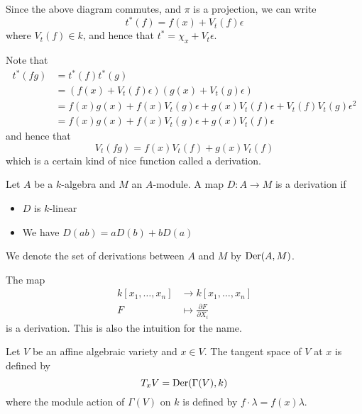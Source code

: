 Since the above diagram commutes, and $\pi$ is a projection, we can write
\begin{equation*}
    t^*(f) = f(x) + V_t(f)\epsilon
\end{equation*}
where $V_t(f)\in k$, and hence that $t^* = \chi_x + V_t\epsilon$. 

Note that
\begin{align*}
    t^*(fg) 
    &= t^*(f)t^*(g) \\
    &= (f(x)+V_t(f)\epsilon)(g(x)+V_t(g)\epsilon) \\
    &= f(x)g(x) + f(x)V_t(g)\epsilon + g(x)V_t(f)\epsilon + V_t(f)V_t(g)\epsilon^2 \\
    &= f(x)g(x) + f(x)V_t(g)\epsilon + g(x)V_t(f)\epsilon
\end{align*}
and hence that
\begin{equation*}
    V_t(fg) = f(x)V_t(f) + g(x)V_t(f)
\end{equation*}
which is a certain kind of nice function called a derivation.

\begin{definition}[Derivation]
Let $A$ be a $k$-algebra and $M$ an $A$-module. A map $D\colon A\longrightarrow M$ is a derivation if 
\begin{itemize}
    \item $D$ is $k$-linear
    \item We have $D(ab)=aD(b)+bD(a)$
\end{itemize}
We denote the set of derivations between $A$ and $M$ by $\operatorname{Der}(A, M)$.
\end{definition}

\begin{example}
The map 
\begin{align*}
    k[x_1, \ldots, x_n]&\longrightarrow k[x_1, \ldots, x_n] \\
    F&\longmapsto \frac{\partial F}{\partial X_i}
\end{align*}
is a derivation. This is also the intuition for the name. 
\end{example}

\begin{definition}
Let $V$ be an affine algebraic variety and $x\in V$. The tangent space of $V$ at $x$ is defined by 
\begin{equation*}
    T_x V = \operatorname{Der}(\Gamma(V), k)
\end{equation*}
where the module action of $\Gamma(V)$ on $k$ is defined by $f\cdot \lambda = f(x)\lambda$. 
\end{definition}

